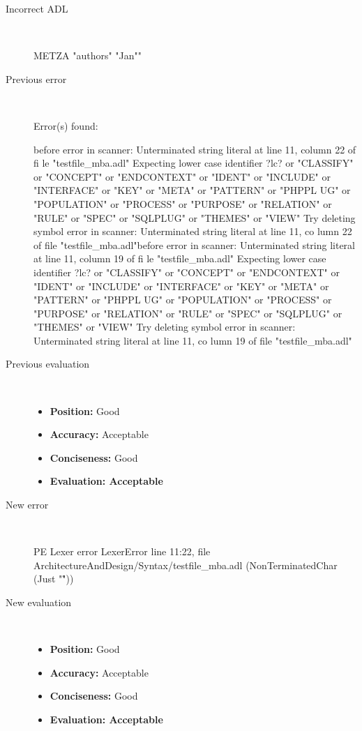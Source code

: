 \hrulefill

\begin{description}
  \item[Incorrect ADL]~\\
\begin{adl}
METZA "authors"  "Jan""\end{adl}
  \item[Previous error]~\\
\begin{haskell}
Error(s) found:

before error in scanner: Unterminated string literal at line 11, column 22 of fi
le "testfile_mba.adl"
Expecting lower case identifier ?lc? or "CLASSIFY" or "CONCEPT" or "ENDCONTEXT"
or "IDENT" or "INCLUDE" or "INTERFACE" or "KEY" or "META" or "PATTERN" or "PHPPL
UG" or "POPULATION" or "PROCESS" or "PURPOSE" or "RELATION" or "RULE" or "SPEC"
or "SQLPLUG" or "THEMES" or "VIEW"
Try deleting symbol error in scanner: Unterminated string literal at line 11, co
lumn 22 of file "testfile_mba.adl"before error in scanner: Unterminated string literal at line 11, column 19 of fi
le "testfile_mba.adl"
Expecting lower case identifier ?lc? or "CLASSIFY" or "CONCEPT" or "ENDCONTEXT"
or "IDENT" or "INCLUDE" or "INTERFACE" or "KEY" or "META" or "PATTERN" or "PHPPL
UG" or "POPULATION" or "PROCESS" or "PURPOSE" or "RELATION" or "RULE" or "SPEC"
or "SQLPLUG" or "THEMES" or "VIEW"
Try deleting symbol error in scanner: Unterminated string literal at line 11, co
lumn 19 of file "testfile_mba.adl"
\end{haskell}
  \item[Previous evaluation]~\\
    \begin{itemize}
    \item \textbf{Position:} Good
    \item \textbf{Accuracy:} Acceptable
    \item \textbf{Conciseness:} Good
    \item \textbf{Evaluation: Acceptable}
    \end{itemize}
  \item[New error]~\\
\begin{haskell}
PE Lexer error LexerError line 11:22, file ArchitectureAndDesign/Syntax/testfile_mba.adl (NonTerminatedChar (Just "\r"))\end{haskell}
  \item[New evaluation]~\\
    \begin{itemize}
    \item \textbf{Position:} Good
    \item \textbf{Accuracy:} Acceptable
    \item \textbf{Conciseness:} Good
    \item \textbf{Evaluation: Acceptable}
    \end{itemize}
  \end{description}

